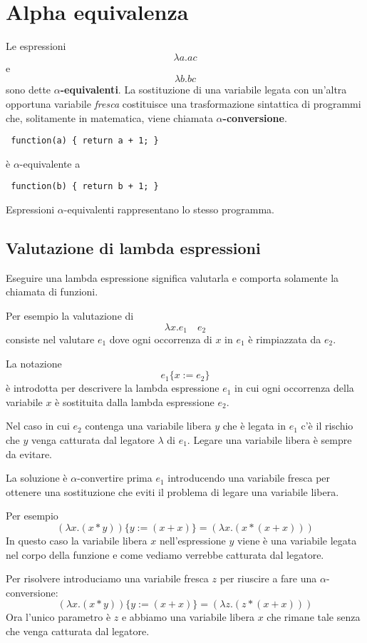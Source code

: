 \section{Alpha equivalenza}
Le espressioni
\[ \lambda a.ac \]
e
\[ \lambda b.bc \]
sono dette \textbf{$\alpha$-equivalenti}. La sostituzione di una variabile legata con un'altra opportuna variabile
\emph{fresca} costituisce una trasformazione sintattica di programmi che, solitamente in matematica, viene chiamata
\textbf{$\alpha$-conversione}.
\begin{center}
	\verb| function(a) { return a + 1; } |
\end{center}
è $\alpha$-equivalente a
\begin{center}
	\verb| function(b) { return b + 1; } |
\end{center}
Espressioni $\alpha$-equivalenti rappresentano lo stesso programma.

\subsection{Valutazione di lambda espressioni}
Eseguire una lambda espressione significa valutarla e comporta solamente la chiamata di funzioni.

Per esempio la valutazione di
\[ \lambda x.e_1 \quad e_2 \]
consiste nel valutare $e_1$ dove ogni occorrenza di $x$ in $e_1$ è rimpiazzata da $e_2$.

La notazione
\[ e_1 \{ x := e_2 \} \]
è introdotta per descrivere la lambda espressione $e_1$ in cui ogni occorrenza della variabile $x$ è sostituita dalla
lambda espressione $e_2$.

Nel caso in cui $e_2$ contenga una variabile libera $y$ che è legata in $e_1$ c'è il rischio che $y$ venga catturata
dal legatore $\lambda$ di $e_1$. Legare una variabile libera è sempre da evitare.

La soluzione è $\alpha$-convertire prima $e_1$ introducendo una variabile fresca per ottenere una sostituzione che
eviti il problema di legare una variabile libera.

Per esempio
\[ (\lambda x.(x * y)) \{ y := (x + x) \} = (\lambda x.(x * (x + x))) \]
In questo caso la variabile libera $x$ nell'espressione $y$ viene è una variabile legata nel corpo della funzione e
come vediamo verrebbe catturata dal legatore.

Per risolvere introduciamo una variabile fresca $z$ per riuscire a fare una $\alpha$-conversione:
\[ (\lambda x.(x * y)) \{ y := (x + x) \} = (\lambda z.(z * (x + x))) \]
Ora l'unico parametro è $z$ e abbiamo una variabile libera $x$ che rimane tale senza che venga catturata dal legatore.